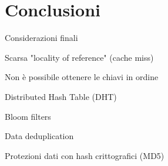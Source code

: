 \section{Conclusioni}

\begin{frame}{Considerazioni finali}
	
\vspace{-9pt}
\BI
\item Scarsa "locality of reference" (cache miss)
\item Non è possibile ottenere le chiavi in ordine
\EI

\medskip
{}
\BI
\item Distributed Hash Table (DHT)
\item Bloom filters
\EI

\medskip
{}
\BI
\item Data deduplication
\item Protezioni dati con hash crittografici (MD5)
\EI

\end{frame}

	


